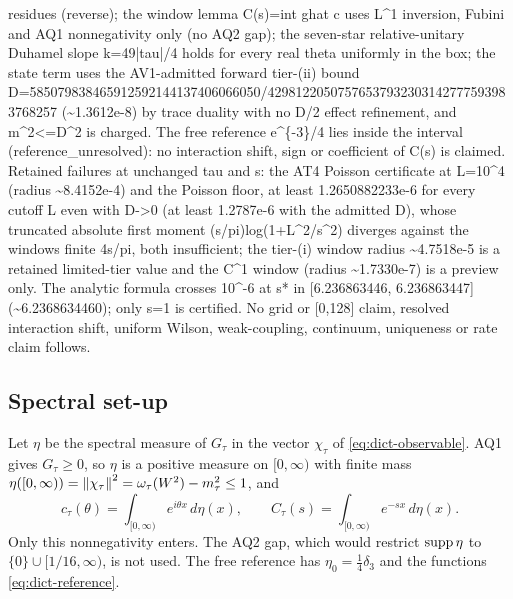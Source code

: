 \begin{gatequote}
residues (reverse); the window lemma C(s)=int ghat c uses L\textasciicircum{}1
inversion, Fubini and AQ1 nonnegativity only (no AQ2 gap); the seven-star
relative-unitary Duhamel slope k=49|tau|/4 holds for every real theta
uniformly in the box; the state term uses the AV1-admitted forward tier-(ii)
bound
D=585079838465912592144137406066050/42981220507576537932303142777593983768257
(\textasciitilde{}1.3612e-8) by trace duality with no D/2 effect refinement,
and m\textasciicircum{}2<=D\textasciicircum{}2 is charged. The free reference
e\textasciicircum{}\{-3\}/4 lies inside the interval (reference\_unresolved):
no interaction shift, sign or coefficient of C(s) is claimed. Retained
failures at unchanged tau and s: the AT4 Poisson certificate at
L=10\textasciicircum{}4 (radius \textasciitilde{}8.4152e-4) and the Poisson
floor, at least 1.2650882233e-6 for every cutoff L even with D->0 (at least
1.2787e-6 with the admitted D), whose truncated absolute first moment
(s/pi)log(1+L\textasciicircum{}2/s\textasciicircum{}2) diverges against the
window\textquotesingle{}s finite 4s/pi, both insufficient; the tier-(i) window radius
\textasciitilde{}4.7518e-5 is a retained limited-tier value and the
C\textasciicircum{}1 window (radius \textasciitilde{}1.7330e-7) is a preview
only. The analytic formula crosses 10\textasciicircum{}-6 at s* in
[6.236863446, 6.236863447] (\textasciitilde{}6.2368634460); only s=1 is
certified. No grid or [0,128] claim, resolved interaction shift, uniform
Wilson, weak-coupling, continuum, uniqueness or rate claim follows.
\end{gatequote}

\subsection{Spectral set-up}
\label{sec:av2-spectral}
Let $\eta$ be the spectral measure of $G_\tau$ in the vector $\chi_\tau$ of
\eqref{eq:dict-observable}. AQ1 gives $G_\tau\ge0$, so $\eta$ is a positive
measure on $[0,\infty)$ with finite mass
$\eta([0,\infty))=\left\lVert\chi_\tau\right\rVert^2=\omega_\tau(W^2)-m_\tau^2\le1$, and
\begin{equation}
 c_\tau(\theta)=\int_{[0,\infty)}e^{i\theta x}\,d\eta(x),\qquad
 C_\tau(s)=\int_{[0,\infty)}e^{-sx}\,d\eta(x).
 \label{eq:av2-spectral}
\end{equation}
Only this nonnegativity enters. The AQ2 gap, which would restrict
$\operatorname{supp}\eta$ to $\{0\}\cup[1/16,\infty)$, is not used. The free reference has
$\eta_0=\tfrac14\delta_3$ and the functions \eqref{eq:dict-reference}.

